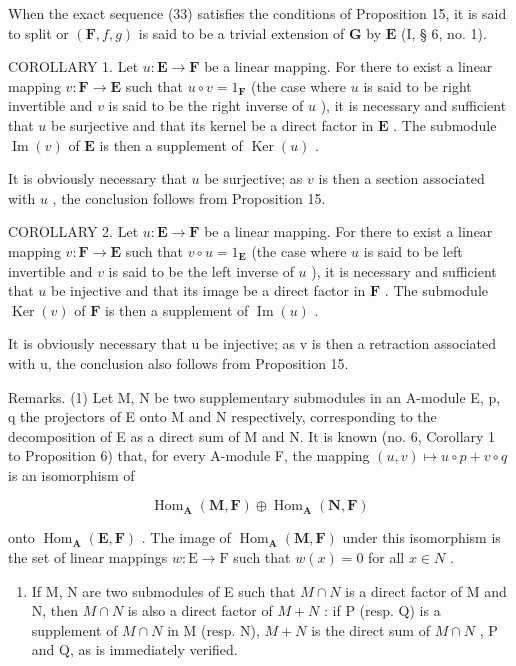 When the exact sequence (33) satisfies the conditions of Proposition 15, it is said to split or \((\mathbf{F}, f, g)\) is said to be a trivial extension of \(\mathbf{G}\) by \(\mathbf{E}\) (I, § 6, no. 1).

COROLLARY 1. Let \(u: \mathbf{E} \to \mathbf{F}\) be a linear mapping. For there to exist a linear mapping \(v: \mathbf{F} \to \mathbf{E}\) such that \(u \circ v = 1_{\mathbf{F}}\) (the case where \(u\) is said to be right invertible and \(v\) is said to be the right inverse of \(u\) ), it is necessary and sufficient that \(u\) be surjective and that its kernel be a direct factor in \(\mathbf{E}\) . The submodule \(\operatorname{Im}(v)\) of \(\mathbf{E}\) is then a supplement of \(\operatorname{Ker}(u)\) .

It is obviously necessary that \(u\) be surjective; as \(v\) is then a section associated with \(u\) , the conclusion follows from Proposition 15.

COROLLARY 2. Let \(u: \mathbf{E} \to \mathbf{F}\) be a linear mapping. For there to exist a linear mapping \(v: \mathbf{F} \to \mathbf{E}\) such that \(v \circ u = 1_{\mathbf{E}}\) (the case where \(u\) is said to be left invertible and \(v\) is said to be the left inverse of \(u\) ), it is necessary and sufficient that \(u\) be injective and that its image be a direct factor in \(\mathbf{F}\) . The submodule \(\operatorname{Ker}(v)\) of \(\mathbf{F}\) is then a supplement of \(\operatorname{Im}(u)\) .

It is obviously necessary that u be injective; as v is then a retraction associated with u, the conclusion also follows from Proposition 15.

Remarks. (1) Let M, N be two supplementary submodules in an A-module E, p, q the projectors of E onto M and N respectively, corresponding to the decomposition of E as a direct sum of M and N. It is known (no. 6, Corollary 1 to Proposition 6) that, for every A-module F, the mapping \((u, v) \mapsto u \circ p + v \circ q\) is an isomorphism of

\[
\operatorname{Hom} _ {\mathbf {A}} (\mathbf {M}, \mathbf {F}) \oplus \operatorname{Hom} _ {\mathbf {A}} (\mathbf {N}, \mathbf {F})
\]

onto \(\operatorname{Hom}_{\mathbf{A}}(\mathbf{E},\mathbf{F})\) . The image of \(\operatorname{Hom}_{\mathbf{A}}(\mathbf{M},\mathbf{F})\) under this isomorphism is the set of linear mappings \(w:\mathrm{E}\to \mathrm{F}\) such that \(w(x) = 0\) for all \(x\in N\) .

\begin{enumerate}
\def\labelenumi{(\arabic{enumi})}
\setcounter{enumi}{1}
\tightlist
\item
  If M, N are two submodules of E such that \(M \cap N\) is a direct factor of M and N, then \(M \cap N\) is also a direct factor of \(M + N\) : if P (resp. Q) is a supplement of \(M \cap N\) in M (resp. N), \(M + N\) is the direct sum of \(M \cap N\) , P and Q, as is immediately verified.
\end{enumerate}

